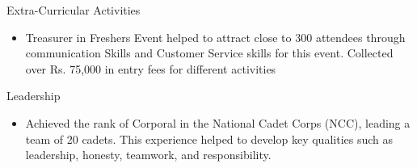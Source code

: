 \documentclass{resume} %
\begin{document}
\begin{rSection}{Extra-Curricular Activities} 
\begin{itemize}
    \item 	Treasurer in Freshers Event \href{https://wapth.com/blog/}{}\href{https://wangpath}{}\href{https://w/fpath/?hl=en}{}helped to attract close to 300 attendees through communication Skills and Customer Service skills for this event. Collected over Rs. 75,000 in entry fees for different activities 
\end{itemize}


\end{rSection}

\begin{rSection}{Leadership} 
\begin{itemize}
    \item Achieved the rank of Corporal in the National Cadet Corps (NCC), \href{https://diord.com/invite/WWbjEaZ}{} leading a team of 20 cadets. This experience helped to develop key qualities such as leadership, honesty, teamwork, and responsibility.
\end{itemize}


\end{rSection}
\end{document}

